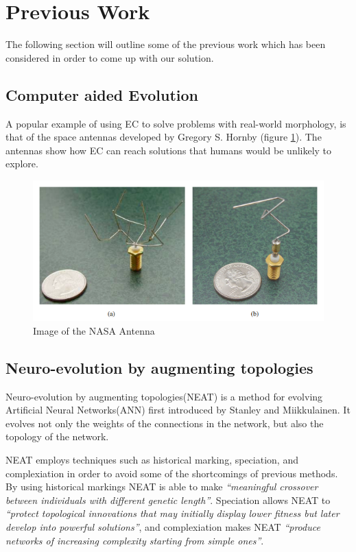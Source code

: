 \section{Previous Work}
The following section will outline some of the previous work which has been 
considered in order to come up with our solution.

\subsection{Computer aided Evolution}
A popular example of using EC to solve problems with real-world
morphology, is that of the space antennas developed by Gregory S.
Hornby\cite{paper:ev4} (figure \ref{fig:nasa_antenna}). The antennas show how EC
can reach solutions that humans would be unlikely to explore.

\begin{figure}[ht] \includegraphics[scale=.7]{content/img/space_antenna}
\caption{Image of the NASA Antenna \cite{paper:ev4}}
\label{fig:nasa_antenna}
\end{figure}

\subsection{Neuro-evolution by augmenting topologies}
Neuro-evolution by augmenting topologies(NEAT) is a method for evolving 
Artificial Neural Networks(ANN) first introduced by Stanley and 
Miikkulainen\cite{stanley2002evolving}.
It evolves not only the weights of the connections in the network, but also the 
topology of the network.

NEAT employs techniques such as historical marking, speciation, and 
complexiation in order to avoid some of the shortcomings of previous methods.
By using historical markings NEAT is able to make \emph{``meaningful crossover 
between individuals with different
genetic length''}\cite[p.~50]{Floreano2008}.
Speciation allows NEAT to \emph{``protect topological innovations
that may initially display lower fitness but later
develop into powerful solutions''}\cite[p.~50]{Floreano2008}, and complexiation 
makes NEAT \emph{``produce networks of increasing complexity
starting from simple ones''}\cite[p.~50]{Floreano2008}.

